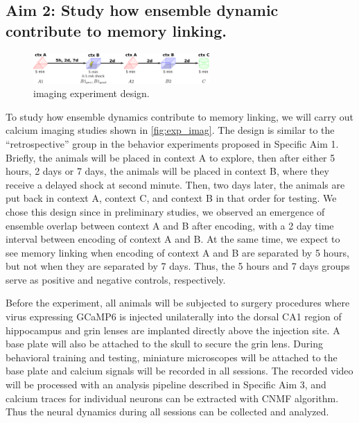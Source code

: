 \documentclass[master.tex]{subfiles}
\begin{document}
\subsection*{Aim 2: Study how ensemble dynamic contribute to memory linking.}


\begin{figure}
  \centering \includegraphics[width=0.6\textwidth]{Figures/exp_imag.pdf}
  \caption{\footnotesize imaging experiment design.}
  \label{fig:exp_imag}
\end{figure}

To study how ensemble dynamics contribute to memory linking, we will carry out
calcium imaging studies shown in \autoref{fig:exp_imag}. The design is similar
to the ``retrospective'' group in the behavior experiments proposed in Specific
Aim 1. Briefly, the animals will be placed in context A to explore, then after
either 5 hours, 2 days or 7 days, the animals will be placed in context B, where
they receive a delayed shock at second minute. Then, two days later, the animals
are put back in context A, context C, and context B in that order for testing.
We chose this design since in preliminary studies, we observed an emergence of
ensemble overlap between context A and B after encoding, with a 2 day time
interval between encoding of context A and B. At the same time, we expect to see
memory linking when encoding of context A and B are separated by 5 hours, but
not when they are separated by 7 days. Thus, the 5 hours and 7 days groups serve
as positive and negative controls, respectively.

Before the experiment, all animals will be subjected to surgery procedures where
virus expressing GCaMP6 is injected unilaterally into the dorsal CA1 region of
hippocampus and grin lenses are implanted directly above the injection site. A
base plate will also be attached to the skull to secure the grin lens. During
behavioral training and testing, miniature microscopes will be attached to the
base plate and calcium signals will be recorded in all sessions. The recorded
video will be processed with an analysis pipeline described in Specific Aim 3,
and calcium traces for individual neurons can be extracted with CNMF algorithm.
Thus the neural dynamics during all sessions can be collected and analyzed.
\end{document}
